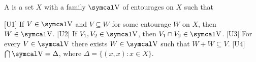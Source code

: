 \begin{definition}\label{def:uniform_space}\cite[section 8.1]{Engelking1989}
  A  is a set \( X \) with a family \( \V \) of entourages on \( X \) such that
  \begin{defenum}
    [U1] If \( V \in \V \) and \( V \subseteq W \) for some entourage \( W \) on \( X \), then \( W \in \V \).
    [U2] If \( V_1, V_2 \in \V \), then \( V_1 \cap V_2 \in \V \).
    [U3] For every \( V \in \V \) there exists \( W \in \V \) such that \( W + W \subseteq V \).
    [U4] \( \bigcap \V = \Delta \), where \( \Delta = \{ (x, x) \colon x \in X \} \).
  \end{defenum}
\end{definition}

